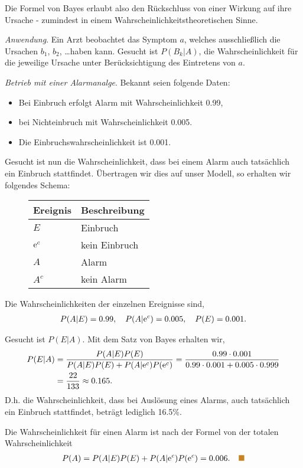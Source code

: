 \begin{bsp}
Die Formel von Bayes erlaubt also den Rückschluss von einer Wirkung auf ihre
Ursache - zumindest in einem Wahrscheinlichkeitstheoretischen Sinne.

\textit{Anwendung}. Ein Arzt beobachtet das Symptom $a$, welches ausschließlich
die Ursachen $b_1$, $b_2$, \ldots haben kann. Gesucht ist $P(B_k|A)$, die
Wahrscheinlichkeit für die jeweilige Ursache unter Berücksichtigung des
Eintretens von $a$.\bsphere
\end{bsp}
\begin{bsp}
\textit{Betrieb mit einer Alarmanalge}. Bekannt seien folgende Daten:
\begin{itemize}[label=-]
  \item Bei Einbruch erfolgt Alarm mit Wahrscheinlichkeit 0.99,
  \item bei Nichteinbruch mit Wahrscheinlichkeit 0.005.
  \item Die Einbruchswahrscheinlichkeit ist 0.001. 
\end{itemize}
 
Gesucht ist nun die Wahrscheinlichkeit, dass bei einem Alarm auch tatsächlich
ein Einbruch stattfindet. Übertragen wir dies auf unser Modell, so erhalten
wir folgendes Schema:
\begin{figure}[H]
\begin{tabular}{l|l}
\textbf{Ereignis} & \textbf{Beschreibung}\\\hline
$E$ & Einbruch\\
$\mathrm{e}^c$ & kein Einbruch\\
$A$ & Alarm\\
$A^c$ & kein Alarm
\end{tabular}
\end{figure}
Die Wahrscheinlichkeiten der einzelnen Ereignisse sind,
\begin{align*}
P(A|E) = 0.99,\quad P(A|\mathrm{e}^c) = 0.005,\quad P(E) = 0.001.
\end{align*}

Gesucht ist $P(E|A)$. Mit dem Satz von Bayes erhalten wir,
\begin{align*}
P(E|A) &= \frac{P(A|E)P(E)}{P(A|E)P(E)+P(A|\mathrm{e}^c)P(\mathrm{e}^c)}
= \frac{0.99\cdot 0.001}{0.99\cdot 0.001+0.005\cdot 0.999}
\\ 
&= \frac{22}{133} \approx 0.165.
\end{align*}
D.h. die Wahrscheinlichkeit, dass bei Auslösung eines Alarms,
auch tatsächlich ein Einbruch stattfindet, beträgt lediglich 16.5\%.

Die Wahrscheinlichkeit für einen Alarm ist nach der Formel von der totalen
Wahrscheinlichkeit
\begin{align*}
P(A) = P(A|E)P(E)+P(A|\e^c)P(\e^c) = 0.006.\bsphere
\end{align*}
\end{bsp}